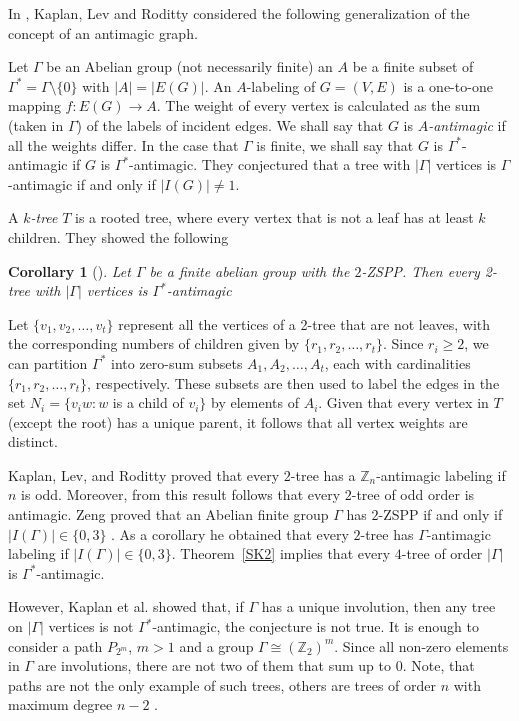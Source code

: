 \documentclass{article}
\newcommand{\zet}{\mathbb{Z}}
\newtheorem{cor}[thm]{Corollary}
\begin{document}
In \cite{KLR}, Kaplan, Lev and Roditty considered the following generalization of the
concept of an antimagic graph.


Let $\Gamma$ be an Abelian group (not necessarily finite) an $A$ be a finite subset of $\Gamma^*=\Gamma\setminus\{0\}$ with $|A| = |E(G)|$. An $A$-labeling
of $G=(V,E)$ is a one-to-one mapping $f \colon E(G) \to A$. The weight of every vertex is calculated as the sum (taken in $\Gamma$) of the labels of incident edges.
 We shall say that $G$ is \textit{$A$-antimagic} if all the weights differ. In the case that $\Gamma$ is finite, we shall say that $G$ is $\Gamma^*$-antimagic if $G$ is $\Gamma^*$-antimagic.
They conjectured that a tree with $|\Gamma|$ vertices is $\Gamma$-antimagic if and only if $|I(G)|\neq 1$.

{A \textit{$k$-tree} $T$ is a rooted tree, where every vertex that is not a leaf has at least $k$ children.}
They showed the following
\begin{cor}[\cite{KLR}]
    Let $\Gamma$ be a finite abelian group with the $2$-ZSPP. Then
every 2-tree with $|\Gamma|$ vertices is $\Gamma^*$-antimagic
\end{cor}
Let $\{v_1,v_2,\ldots,v_t\}$ represent all the vertices of a 2-tree that are not leaves, with the corresponding numbers of children given by $\{r_1,r_2,\ldots,r_t\}$. Since $r_i\geq 2$, we can partition $\Gamma^*$ into zero-sum subsets $A_1,A_2,\ldots,A_t$, each with cardinalities 
$\{r_1,r_2,\ldots,r_t\}$, respectively. These subsets are then used to label the edges in the set $N_i=\{v_iw\colon w$ is a child of $v_i\}$ by elements of $A_i$. Given that every vertex in $T$ (except the root) has a unique parent, it follows that all vertex weights are distinct.
 

Kaplan, Lev, and Roditty proved that every $2$-tree has a $\zet_n$-antimagic labeling if $n$ is odd. Moreover, from this result follows that every $2$-tree of odd order is antimagic. Zeng proved that an Abelian finite group $\Gamma$ has $2$-ZSPP if and only if $|I(\Gamma)|\in\{0,3\}$ \cite{Zeng}. As a corollary he obtained that every $2$-tree has $\Gamma$-antimagic labeling if $|I(\Gamma)|\in\{0,3\}$. Theorem~\ref{SK2} implies that every $4$-tree of order $|\Gamma|$ is $\Gamma^*$-antimagic. 

 However, Kaplan et al. \cite{KLR} showed that, if $\Gamma$ has a unique involution, then any tree on $|\Gamma|$ vertices is not $\Gamma^*$-antimagic, the conjecture is not true. It is enough to consider a path $P_{2^m}$, $m>1$ and a group $\Gamma\cong(\zet_2)^m$. Since all non-zero elements in $\Gamma$ are involutions, there are not two of them that sum up to $0$. Note, that paths are not the only example of such trees, others are trees of order $n$ with maximum degree $n-2$ \cite{Cic24}. 
\end{document}

